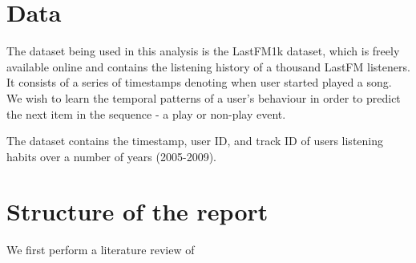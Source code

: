 \section{Data}

The dataset being used in this analysis is the LastFM1k dataset, which is freely available online and contains the listening history of a thousand LastFM listeners. It consists of a series of timestamps denoting when user started played a song. We wish to learn the temporal patterns of a user's behaviour in order to predict the next item in the sequence - a play or non-play event. 

The dataset contains the timestamp, user ID, and track ID of users listening habits over a number of years (2005-2009).

\section{Structure of the report}

We first perform a literature review of 
